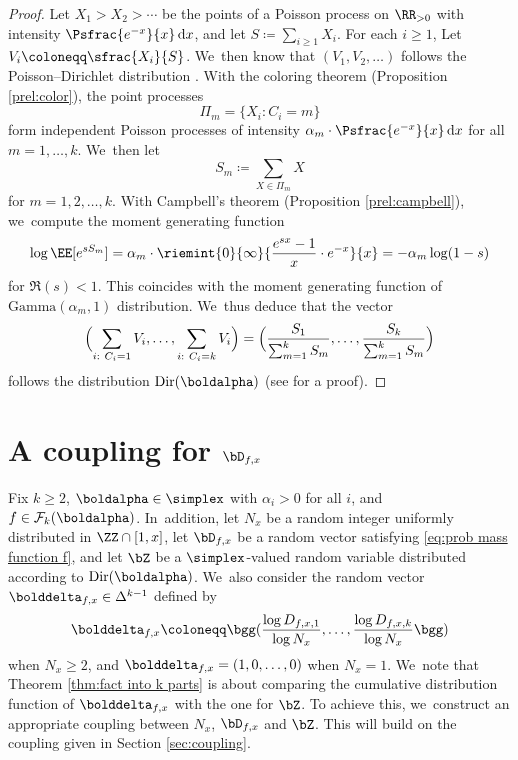 \begin{proof}
Let $X_1 > X_2 > \cdots$ be the points of a Poisson process on $\RR_{>0}$ with intensity $\Psfrac{e^{-x}}{x} \, \mathrm dx$, and let $S \coloneqq \sum_{i \ge 1} X_i$. For each $i \ge 1$, Let $V_i \coloneqq \sfrac{X_i}{S}$. We~then know that $(V_1, V_2, \ldots)$ follows the Poisson--Dirichlet distribution \cite[Th.\,2.2]{Feng10}. With the coloring theorem (Proposition \ref{prel:color}), the point processes
\[
\Pi_m = \{X_i : C_i = m\}
\]
form independent Poisson processes of intensity $\alpha_m\cdot \Psfrac{e^{-x}}{x} \, \mathrm dx$ for all $m = 1, \ldots, k$. We~then let
\[
S_m \coloneqq \sum_{X \in \Pi_m} X
\]
for $m=1,2,\dots,k$. With Campbell's theorem (Proposition \ref{prel:campbell}), we~compute the moment generating function
\[
\log \EE[e^{sS_m}] = \alpha_m\cdot \riemint{0}{\infty}{\frac{e^{sx}-1}{x}\cdot e^{-x}}{x} = -\alpha_m\log(1-s)
\]
for $\Re(s) < 1$. This coincides with the moment generating function of $\text{Gamma}(\alpha_m, 1)$ distribution. We~thus deduce that the vector
\[
\Bigl(\sum_{i:\ C_i = 1} V_i, \ldots, \sum_{i:\ C_i = k} V_i \Bigr) = \Bigl(\frac{S_1}{\sum_{m=1}^k S_m}, \ldots, \frac{S_k}{\sum_{m=1}^k S_m} \Bigr)
\]
follows the distribution $\text{Dir}(\boldalpha)$ (see \cite[Ch.\,49, pp.\,485-487]{KotzBal00} for a proof).
\end{proof}

\section{A coupling for \texorpdfstring{$\bD_{f, x}$}{bD}}\label{sec:coupling for factorizations}

Fix $k\ge2$, $\boldalpha \in \simplex$ with $\alpha_i>0$ for all $i$, and $f\in\mathcal{F}_k(\boldalpha)$. In~addition, let $N_x$ be a random integer uniformly distributed in $\ZZ \cap [1, x]$, let $\bD_{f, x}$ be a random vector satisfying \eqref{eq:prob mass function f}, and let $\bZ$ be a $\simplex$-valued random variable distributed according to $\text{Dir}(\boldalpha)$. We~also consider the random vector $\bolddelta_{f, x} \in \Delta^{k-1}$ defined by
\begin{equation}
\label{eq:defn delta}
\bolddelta_{f, x} \coloneqq \bgg(\frac{\log D_{f,x,1}}{\log N_x},\dots,\frac{\log D_{f,x,k}}{\log N_x}\bgg)
\end{equation}
when $N_x \ge 2$, and $\bolddelta_{f,x} = (1,0,\ldots,0)$ when $N_x = 1$. We~note that Theorem \ref{thm:fact into k parts} is about comparing the cumulative distribution function of $\bolddelta_{f, x}$ with the one for $\bZ$. To achieve this, we~construct an appropriate coupling between $N_x$, $\bD_{f, x}$ and $\bZ$. This will build on the coupling given in Section \ref{sec:coupling}.

